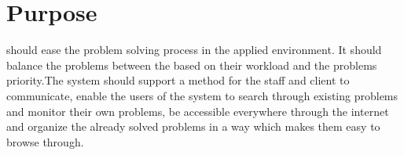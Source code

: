 \section{Purpose}
\hdesk[] should ease the problem solving process in the applied environment. 
It should balance the problems between the \astaff[] based on their workload and the problems priority.
The system should support a method for the staff and client to communicate, enable the users of the system to search through existing problems and monitor their own problems, be accessible everywhere through the internet and organize the already solved problems in a way which makes them easy to browse through.

